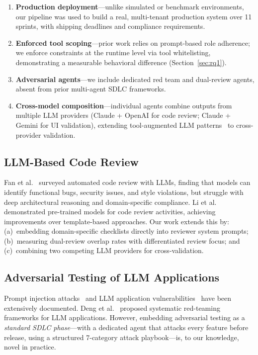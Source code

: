 \documentclass[a4paper,USenglish,cleveref,autoref]{lipics-v2021}
\begin{document}
\begin{enumerate}
    \item \textbf{Production deployment}---unlike simulated or benchmark environments, our pipeline was used to build a real, multi-tenant production system over 11 sprints, with shipping deadlines and compliance requirements.
    \item \textbf{Enforced tool scoping}---prior work relies on prompt-based role adherence; we enforce constraints at the runtime level via tool whitelisting, demonstrating a measurable behavioral difference (Section~\ref{sec:rq1}).
    \item \textbf{Adversarial agents}---we include dedicated red team and dual-review agents, absent from prior multi-agent SDLC frameworks.
    \item \textbf{Cross-model composition}---individual agents combine outputs from multiple LLM providers (Claude + OpenAI for code review; Claude + Gemini for UI validation), extending tool-augmented LLM patterns~\cite{schick2023} to cross-provider validation.
\end{enumerate}

\subsection{LLM-Based Code Review}

Fan et al.~\cite{lu2023} surveyed automated code review with LLMs, finding that models can identify functional bugs, security issues, and style violations, but struggle with deep architectural reasoning and domain-specific compliance. Li et al.~\cite{li2022} demonstrated pre-trained models for code review activities, achieving improvements over template-based approaches. Our work extends this by: (a)~embedding domain-specific checklists directly into reviewer system prompts; (b)~measuring dual-review overlap rates with differentiated review focus; and (c)~combining two competing LLM providers for cross-validation.

\subsection{Adversarial Testing of LLM Applications}

Prompt injection attacks~\cite{perez2022, greshake2023} and LLM application vulnerabilities~\cite{owasp2025} have been extensively documented. Deng et al.~\cite{deng2024} proposed systematic red-teaming frameworks for LLM applications. However, embedding adversarial testing as a \emph{standard SDLC phase}---with a dedicated agent that attacks every feature before release, using a structured 7-category attack playbook---is, to our knowledge, novel in practice.
\end{document}
